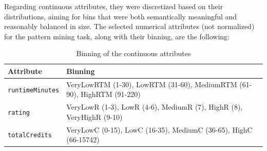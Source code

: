 Regarding continuous attributes, they were discretized based on their distributions, 
aiming for bins that were both semantically meaningful and reasonably balanced in size. 
The selected numerical attributes (not normalized) for the pattern mining task, along with their binning, are the following:
\begin{table}[H]
\centering
\begin{tabular}{ll}
\toprule
\textbf{Attribute} & \textbf{Binning} \\
\midrule
\texttt{runtimeMinutes} & VeryLowRTM (1-30), LowRTM (31-60), MediumRTM (61-90), HighRTM (91-220) \\
\texttt{rating} & VeryLowR (1-3), LowR (4-6), MediumR (7), HighR (8), VeryHighR (9-10) \\
\texttt{totalCredits} & VeryLowC (0-15), LowC (16-35), MediumC (36-65), HighC (66-15742) \\
\bottomrule
\end{tabular}
\caption{Binning of the continuous attributes}
\end{table}

